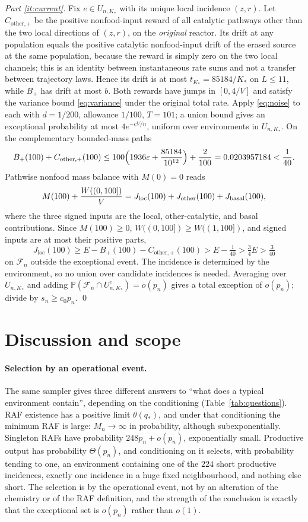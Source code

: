 \documentclass[11pt,letterpaper]{article}
\theoremstyle{plain}
\theoremstyle{definition}
\theoremstyle{remark}
\numberwithin{equation}{section}
\newcommand{\PP}{\mathbb P}
\newcommand{\cF}{\mathcal F}
\newcommand{\eps}{\varepsilon}
\newcommand{\loc}{\mathrm{loc}}
\newcommand{\oth}{\mathrm{other}}
\newcommand{\thetaq}{\theta(q_*)}
\begin{document}
\emph{Part \ref{it:current}.} Fix $e\in U_{n,K_*}$ with its unique local incidence $(z,r)$. Let $C_{\oth,+}$ be the positive nonfood-input reward of all catalytic pathways other than the two local directions of $(z,r)$, on the \emph{original} reactor. Its drift at any population equals the positive catalytic nonfood-input drift of the erased source at the same population, because the reward is simply zero on the two local channels; this is an identity between instantaneous rate sums and not a transfer between trajectory laws. Hence its drift is at most $t_{K_*}=85184/K_*$ on $L\le11$, while $B_+$ has drift at most $b$. Both rewards have jumps in $[0,4/V]$ and satisfy the variance bound \eqref{eq:variance} under the original total rate. Apply \eqref{eq:noise} to each with $d=1/200$, allowance $1/100$, $T=101$; a union bound gives an exceptional probability at most $4e^{-cV/n}$, uniform over environments in $U_{n,K_*}$. On the complementary bounded-mass paths
\begin{equation}\label{eq:currentbudget}
 B_+(100)+C_{\oth,+}(100)\le100\Bigl(1936\eps+\frac{85184}{10^{12}}\Bigr)+\frac2{100}=0.0203957184<\frac1{40} .
\end{equation}
Pathwise nonfood mass balance with $M(0)=0$ reads
\[
 M(100)+\frac{W((0,100])}V=J_\loc(100)+J_\oth(100)+J_{\rm basal}(100),
\]
where the three signed inputs are the local, other-catalytic, and basal contributions. Since $M(100)\ge0$, $W((0,100])\ge W((1,100])$, and signed inputs are at most their positive parts,
\[
 J_\loc(100)\ge E-B_+(100)-C_{\oth,+}(100)>E-\tfrac1{40}>\tfrac34E>\tfrac3{40}
\]
on $\cF_n$ outside the exceptional event. The incidence is determined by the environment, so no union over candidate incidences is needed. Averaging over $U_{n,K_*}$ and adding $\PP(\cF_n\cap U_{n,K_*}^c)=o(p_n)$ gives a total exception of $o(p_n)$; divide by $s_n\ge c_0p_n$. \qed

\section{Discussion and scope}\label{sec:discussion}

\paragraph{Selection by an operational event.}
The same sampler gives three different answers to ``what does a typical environment contain'', depending on the conditioning (Table~\ref{tab:questions}). RAF existence has a positive limit $\thetaq$, and under that conditioning the minimum RAF is large: $M_n\to\infty$ in probability, although subexponentially. Singleton RAFs have probability $248p_n+o(p_n)$, exponentially small. Productive output has probability $\Theta(p_n)$, and conditioning on it selects, with probability tending to one, an environment containing one of the $224$ short productive incidences, exactly one incidence in a huge fixed neighbourhood, and nothing else short. The selection is by the operational event, not by an alteration of the chemistry or of the RAF definition, and the strength of the conclusion is exactly that the exceptional set is $o(p_n)$ rather than $o(1)$.
\end{document}
